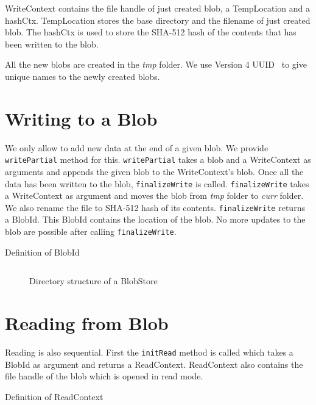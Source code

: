 WriteContext contains the file handle of just created blob, a TempLocation and a hashCtx. TempLocation stores the base directory and the filename of just created blob. The hashCtx is used to store the SHA-512 hash of the contents that has been written to the blob.

All the new blobs are created in the \textit{tmp} folder. We use Version 4 UUID~\cite{leach2005universally} to give unique names to the newly created blobs.

\section{Writing to a Blob}
We only allow to add new data at the end of a given blob. We provide \texttt{writePartial} method for this. \texttt{writePartial} takes a blob and a WriteContext as arguments and appends the given blob to the WriteContext's blob.
Once all the data has been written to the blob, \texttt{finalizeWrite} is called. \texttt{finalizeWrite} takes a WriteContext as argument and moves the blob from \textit{tmp} folder to \textit{curr} folder. We also rename the file to SHA-512 hash of its contents.
\texttt{finalizeWrite} returns a BlobId. This BlobId contains the location of the blob.
No more updates to the blob are possible after calling \texttt{finalizeWrite}.

\begin{program}
  \caption{Definition of BlobId}
  \label{prog:defblobid}
  \inputminted{haskell}{hs/blobid.hs}
\end{program}

\begin{figure}[hbt]
  \caption{Directory structure of a BlobStore}
  \label{fig:blobstore-dirstructure}
\end{figure}

\section{Reading from Blob}
Reading is also sequential. First the \texttt{initRead} method is called which takes a BlobId as argument and returns a ReadContext. ReadContext also contains the file handle of the blob which is opened in read mode.

\begin{program}
  \caption{Definition of ReadContext}
  \label{fig:defreadcontext}
  \inputminted{haskell}{hs/readcontext.hs}
\end{program}

